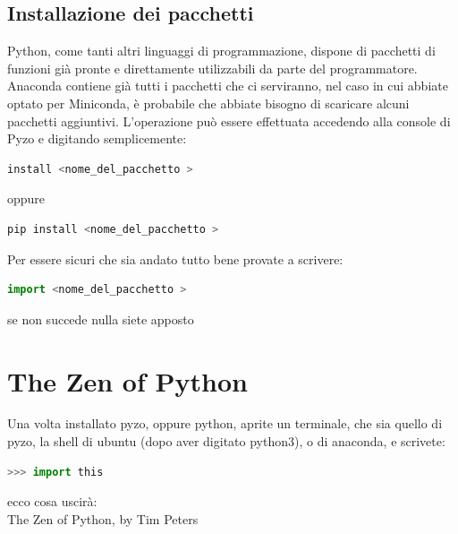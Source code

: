 \documentclass[10pt,a4paper]{article}
\begin{document}
\subsection{Installazione dei pacchetti}
Python, come tanti altri linguaggi di programmazione, dispone di pacchetti di funzioni già pronte e direttamente utilizzabili da parte del programmatore. Anaconda contiene già tutti i pacchetti che ci serviranno, nel caso in cui abbiate optato per Miniconda, è probabile che abbiate bisogno di scaricare alcuni pacchetti aggiuntivi. L'operazione può essere effettuata accedendo alla console di Pyzo e digitando semplicemente:

\begin{lstlisting}[language=Python]
install <nome_del_pacchetto >
\end{lstlisting}
oppure
\begin{lstlisting}[language=Python]
pip install <nome_del_pacchetto >
\end{lstlisting}

Per essere sicuri che sia andato tutto bene provate a scrivere:
\begin{lstlisting}[language=Python]
import <nome_del_pacchetto >
\end{lstlisting}
se non succede nulla siete apposto


\newpage

\section{The Zen of Python}
Una volta installato pyzo, oppure python, aprite un terminale, che sia quello di pyzo, la shell di ubuntu (dopo aver digitato python3), o di anaconda, e scrivete: 
\begin{lstlisting}[language=Python]
>>> import this
\end{lstlisting}
ecco cosa uscirà: \\

\noindent The Zen of Python, by Tim Peters \\
\end{document}
